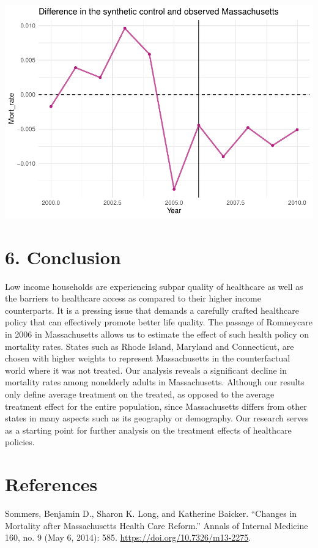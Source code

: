 \documentclass[
]{article}
\begin{document}
\includegraphics{report_files/figure-latex/table2g-1.pdf}

\hypertarget{conclusion}{%
\section{6. Conclusion}\label{conclusion}}

Low income households are experiencing subpar quality of healthcare as
well as the barriers to healthcare access as compared to their higher
income counterparts. It is a pressing issue that demands a carefully
crafted healthcare policy that can effectively promote better life
quality. The passage of Romneycare in 2006 in Massachusetts allows us to
estimate the effect of such health policy on mortality rates. States
such as Rhode Island, Maryland and Connecticut, are chosen with higher
weights to represent Massachusetts in the counterfactual world where it
was not treated. Our analysis reveals a significant decline in mortality
rates among nonelderly adults in Massachusetts. Although our results
only define average treatment on the treated, as opposed to the average
treatment effect for the entire population, since Massachusetts differs
from other states in many aspects such as its geography or demography.
Our research serves as a starting point for further analysis on the
treatment effects of healthcare policies.

\hypertarget{references}{%
\section{References}\label{references}}

Sommers, Benjamin D., Sharon K. Long, and Katherine Baicker. ``Changes
in Mortality after Massachusetts Health Care Reform.'' Annals of
Internal Medicine 160, no. 9 (May 6, 2014): 585.
\url{https://doi.org/10.7326/m13-2275}.
\end{document}
